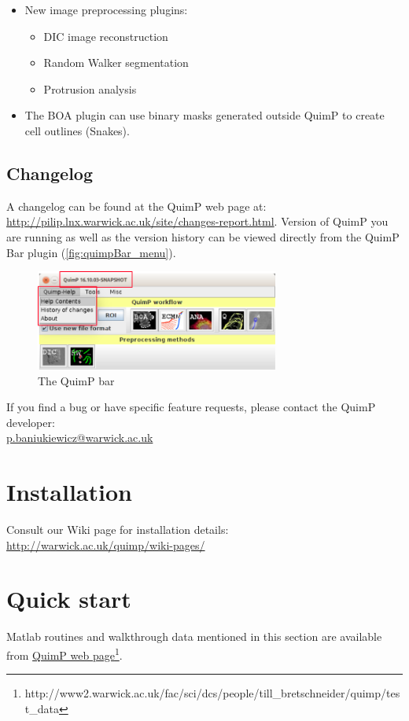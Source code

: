 \documentclass[a4paper,12pt]{article}
\begin{document}
\begin{enumerate}
\begin{itemize}
		\item New image preprocessing plugins:
		\begin{itemize}
			\item DIC image reconstruction
			\item Random Walker segmentation
			\item Protrusion analysis
		\end{itemize}   
		\item The BOA plugin can use binary masks generated outside QuimP to create cell outlines (Snakes).
	\end{itemize}
\end{enumerate}
	
\subsection{Changelog}
A changelog can be found at the QuimP web page at: \url{http://pilip.lnx.warwick.ac.uk/site/changes-report.html}.
Version of QuimP you are running as well as the version history can be viewed directly from the QuimP Bar plugin (\autoref{fig:quimpBar_menu}).
\begin{figure}[ht]
	\centering
	\includegraphics[width=8cm]{quimpBar_menu.png} %
	\caption{The QuimP bar}
	\label{fig:quimpBar_menu}
\end{figure}
 	
If you find a bug or have specific feature requests, please contact the QuimP developer:\\ \href{mailto:p.baniukiewicz@warwick.ac.uk}{p.baniukiewicz@warwick.ac.uk}

\section{Installation}

Consult our Wiki page for installation details:\\ \url{http://warwick.ac.uk/quimp/wiki-pages/}

\section{Quick start}
Matlab routines and walkthrough data mentioned in this section are available from
\href{http://www2.warwick.ac.uk/fac/sci/dcs/people/till_bretschneider/quimp/test_data}{QuimP web page}\footnote{http://www2.warwick.ac.uk/fac/sci/dcs/people/till\_bretschneider/quimp/test\_data}.
\end{document}

